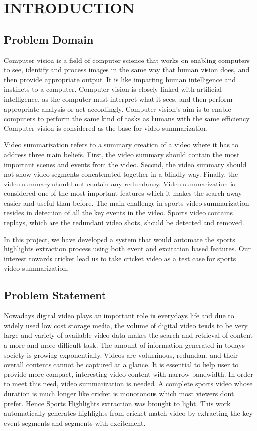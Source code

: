 
\chapter{INTRODUCTION} %
\section{Problem Domain}
Computer vision is a field of computer science that works on enabling computers to see, identify and process images in the same way that human vision does, and then provide appropriate output. It is like imparting human intelligence and instincts to a computer. Computer vision is closely linked with artificial intelligence, as the computer must interpret what it sees, and then perform appropriate analysis or act accordingly. Computer vision's aim is to enable computers to perform the same kind of tasks as humans with the same efficiency.  Computer vision is considered as the base for video summarization

Video summarization refers to a summary creation of a video where it has to address three main beliefs. First, the video summary should contain the most important scenes and events from the video. Second, the video summary should not show video segments concatenated together in a blindly way. Finally, the video summary should not contain any redundancy.
Video summarization is considered one of the most important features which it makes the search away easier and useful than before. The main challenge in sports video summarization resides in detection of all the key events in the video. Sports video contains replays, which are the redundant video shots, should be detected and removed.

In this project, we have developed a system that would automate the sports highlights extraction process using both event and excitation based features. Our interest towards cricket lead us to take cricket video as a test case for sports video summarization. 

\section{Problem Statement} %
Nowadays digital video plays an important role in everyday\textquotesingle s life and due to widely used low cost storage media, the volume of digital video tends to be very large and variety of available video data makes the search and retrieval of content a more and more difficult task. The amount of information generated in today\textquotesingle s society is growing exponentially. Videos are voluminous, redundant and their overall contents cannot be captured at a glance. It is essential to help user to provide more compact, interesting video content with narrow bandwidth. In order to meet this need, video summarization is needed. A complete sports video whose duration is much longer like cricket is monotonous which most viewers don\textquotesingle t prefer. Hence Sports Highlights extraction was brought to light. This work automatically generates highlights from cricket match video by extracting the key event segments and segments with excitement.
